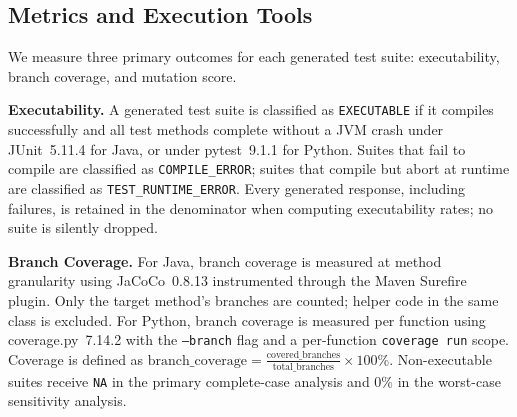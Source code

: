 \begin{table}[htbp]
\centering
\caption{Token Consumption and Cost Details}
\label{tab:token_cost}
\end{table}

\subsection{Metrics and Execution Tools}
\label{subsec:metrics}

We measure three primary outcomes for each generated test suite: executability,
branch coverage, and mutation score.

\textbf{Executability.}
A generated test suite is classified as \texttt{EXECUTABLE} if it compiles
successfully and all test methods complete without a JVM crash under JUnit~5.11.4
for Java, or under pytest~9.1.1 for Python.
Suites that fail to compile are classified as \texttt{COMPILE\_ERROR}; suites
that compile but abort at runtime are classified as \texttt{TEST\_RUNTIME\_ERROR}.
Every generated response, including failures, is retained in the denominator when
computing executability rates; no suite is silently dropped.

\textbf{Branch Coverage.}
For Java, branch coverage is measured at method granularity using JaCoCo~0.8.13
instrumented through the Maven Surefire plugin.
Only the target method's branches are counted; helper code in the same class is
excluded.
For Python, branch coverage is measured per function using coverage.py~7.14.2
with the \texttt{--branch} flag and a per-function \texttt{coverage run} scope.
Coverage is defined as
$\text{branch\_coverage} = \frac{\text{covered\_branches}}{\text{total\_branches}} \times 100\%$.
Non-executable suites receive \texttt{NA} in the primary complete-case analysis
and $0\%$ in the worst-case sensitivity analysis.

